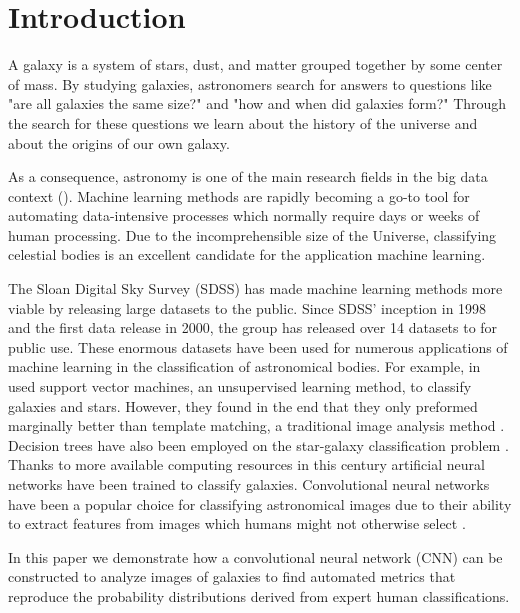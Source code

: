 \section{Introduction}


A galaxy is a system of stars, dust, and matter grouped together by some center of mass. By studying galaxies, astronomers search for answers to questions like "are all galaxies the same size?" and "how and when did galaxies form?" Through the search for these questions we learn about the history of the universe and about the origins of our own galaxy.


As a consequence, astronomy is one of the main research fields in the big data context (\citeauthor{microsoft-galaxies}\cite{microsoft-galaxies}). Machine learning methods are rapidly becoming a go-to tool for automating data-intensive processes which normally require days or weeks of human processing. Due to the incomprehensible size of the Universe, classifying celestial bodies is an excellent candidate for the application machine learning.

The Sloan Digital Sky Survey (SDSS) has made machine learning methods more viable by releasing large datasets to the public. Since SDSS' inception in 1998 and the first data release in 2000, the group has released over 14 datasets to for public use. These enormous datasets have been used for numerous applications of machine learning in the classification of astronomical bodies. For example, \citeauthor{svn-galaxy} in \citeyear{svn-galaxy} used support vector machines, an unsupervised learning method, to classify galaxies and stars. However, they found in the end that they only preformed marginally better than template matching, a traditional image analysis method \cite{svn-galaxy}. Decision trees have also been employed on the star-galaxy classification problem \cite{ball-decision-trees}. Thanks to more available computing resources in this century artificial neural networks have been trained to classify galaxies. Convolutional neural networks have been a popular choice for classifying astronomical images due to their ability to extract features from images which humans might not otherwise select \cite{cnn-star-galaxy}.

In this paper we demonstrate how a convolutional neural network (CNN) can be constructed to analyze images of galaxies to find automated metrics that reproduce the probability distributions derived from expert human classifications.

